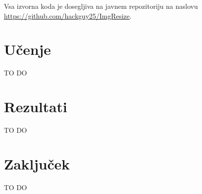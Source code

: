 \documentclass[a4paper,11pt,titlepage]{article}
\begin{document}
Vsa izvorna koda je dosegljiva na javnem repozitoriju na naslovu \url{https://github.com/hackguy25/ImgResize}.

\section{Učenje}

TO DO

\section{Rezultati}

TO DO

\section{Zaključek}

TO DO
\end{document}
